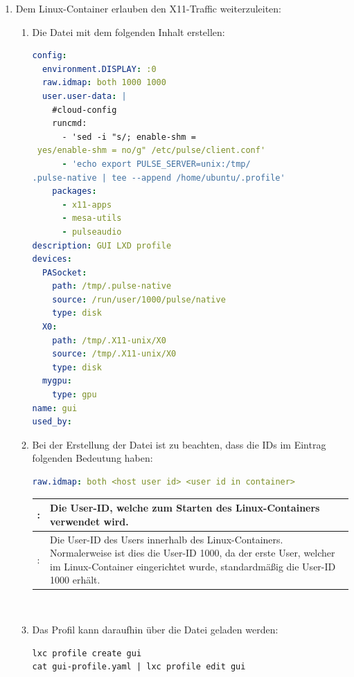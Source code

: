 \begin{enumerate}[label*=\arabic*.]
    \item Dem Linux-Container erlauben den X11-Traffic weiterzuleiten:
        \begin{enumerate}[label*=\arabic*.]
            \item Die Datei  mit dem folgenden Inhalt erstellen:
                \begin{lstlisting}[language=yaml]
config:
  environment.DISPLAY: :0
  raw.idmap: both 1000 1000
  user.user-data: |
    #cloud-config
    runcmd:
      - 'sed -i "s/; enable-shm =
 yes/enable-shm = no/g" /etc/pulse/client.conf'
      - 'echo export PULSE_SERVER=unix:/tmp/
.pulse-native | tee --append /home/ubuntu/.profile'
    packages:
      - x11-apps
      - mesa-utils
      - pulseaudio
description: GUI LXD profile
devices:
  PASocket:
    path: /tmp/.pulse-native
    source: /run/user/1000/pulse/native
    type: disk
  X0:
    path: /tmp/.X11-unix/X0
    source: /tmp/.X11-unix/X0
    type: disk
  mygpu:
    type: gpu
name: gui
used_by:
                \end{lstlisting}

                \item Bei der Erstellung der Datei  ist zu beachten, dass die IDs im Eintrag  folgenden Bedeutung haben:
                    \begin{lstlisting}[language=yaml]
raw.idmap: both <host user id> <user id in container>
                    \end{lstlisting}

                    \begin{tabular}{|>{\raggedright\arraybackslash}p{}|>{\raggedright\arraybackslash}p{}|}
                        \hline
                        <host user id>: & Die User-ID, welche zum Starten des Linux-Containers verwendet wird.\\
                        \hline
                        <user id in container>: & Die User-ID des Users innerhalb des Linux-Containers. Normalerweise ist dies die User-ID 1000, da der erste User, welcher im Linux-Container eingerichtet wurde, standardmäßig die User-ID 1000 erhält.\\
                        \hline
                    \end{tabular}\\

                \item Das Profil kann daraufhin über die Datei  geladen werden:
                    \begin{lstlisting}[style=bash]
lxc profile create gui
cat gui-profile.yaml | lxc profile edit gui
                    \end{lstlisting}
        \end{enumerate}


\end{enumerate}
